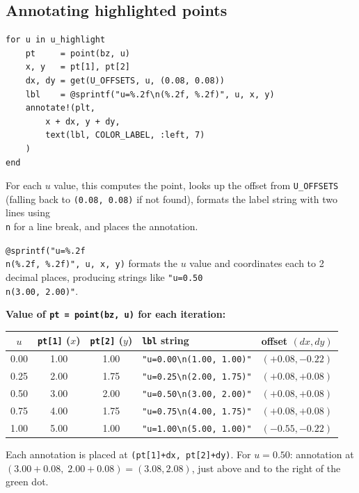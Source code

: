 \documentclass[12pt, a4paper]{article}
\newcommand{\cd}[1]{\texttt{#1}}
\begin{document}
\subsection{Annotating highlighted points}

\begin{verbatim}
for u in u_highlight
    pt     = point(bz, u)
    x, y   = pt[1], pt[2]
    dx, dy = get(U_OFFSETS, u, (0.08, 0.08))
    lbl    = @sprintf("u=%.2f\n(%.2f, %.2f)", u, x, y)
    annotate!(plt,
        x + dx, y + dy,
        text(lbl, COLOR_LABEL, :left, 7)
    )
end
\end{verbatim}

For each $u$ value, this computes the point, looks up the
offset from \cd{U\_OFFSETS} (falling back to \cd{(0.08, 0.08)}
if not found), formats the label string with two lines
using \cd{\\n} for a line break, and places the annotation.

\cd{@sprintf("u=\%.2f\\n(\%.2f, \%.2f)", u, x, y)} formats
the $u$ value and coordinates each to 2 decimal places,
producing strings like \cd{"u=0.50\\n(3.00, 2.00)"}.

\begin{examplebox}
\textbf{Value of \cd{pt = point(bz, u)} for each iteration:}

\medskip
\begin{tabular}{cccll}
\toprule
$u$ & \cd{pt[1]} ($x$) & \cd{pt[2]} ($y$) & \cd{lbl} string & offset $(dx,dy)$ \\
\midrule
0.00 & 1.00 & 1.00 & \cd{"u=0.00\textbackslash n(1.00, 1.00)"} & $(+0.08, -0.22)$ \\
0.25 & 2.00 & 1.75 & \cd{"u=0.25\textbackslash n(2.00, 1.75)"} & $(+0.08, +0.08)$ \\
0.50 & 3.00 & 2.00 & \cd{"u=0.50\textbackslash n(3.00, 2.00)"} & $(+0.08, +0.08)$ \\
0.75 & 4.00 & 1.75 & \cd{"u=0.75\textbackslash n(4.00, 1.75)"} & $(+0.08, +0.08)$ \\
1.00 & 5.00 & 1.00 & \cd{"u=1.00\textbackslash n(5.00, 1.00)"} & $(-0.55, -0.22)$ \\
\bottomrule
\end{tabular}

\medskip
Each annotation is placed at \cd{(pt[1]+dx, pt[2]+dy)}.
For $u=0.50$: annotation at $(3.00+0.08,\; 2.00+0.08) = (3.08, 2.08)$,
just above and to the right of the green dot.
\end{examplebox}
\end{document}
